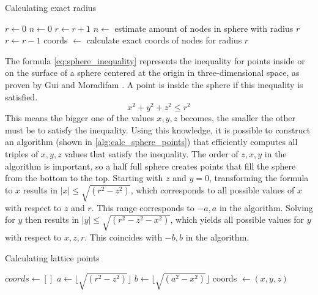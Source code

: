 \begin{algorithm}
\caption{Calculating exact radius}
\label{alg:exact_radius_improved}
\begin{algorithmic}
\State $r \gets 0$
\State $n \gets 0$
    \State $r \gets r + 1$
    \State $n \gets$ estimate amount of nodes in sphere with radius $r$
\EndWhile
\State $ r \gets r - 1$
    \State coords $\gets$ calculate exact coords of nodes for radius $r$
\EndWhile
\end{algorithmic}
\end{algorithm}

The formula \ref{eq:sphere_inequality} represents the inequality for points inside or on the surface of a sphere centered at the origin in three-dimensional space, as proven by Gui and Moradifam \cite{sphereInequality}. A point is inside the sphere if this inequality is satisfied.
\begin{equation}
\label{eq:sphere_inequality}
    x^2 + y^2 + z^2 \leq r^2
\end{equation}
This means the bigger one of the values $x,y,z$ becomes, the smaller the other must be to satisfy the inequality. Using this knowledge, it is possible to construct an algorithm (shown in \ref{alg:calc_sphere_points}) that efficiently computes all triples of $x,y,z$ values that satisfy the inequality. The order of $z,x,y$ in the algorithm is important, so a half full sphere creates points that fill the sphere from the bottom to the top.
Starting with $z$ and $y=0$, transforming the formula to $x$ results in $|x| \leq \sqrt{(r^2 - z^2)}$, which corresponds to all possible values of $x$ with respect to $z$ and $r$. This range corresponds to $-a,a$ in the algorithm. Solving for $y$ then results in $|y| \leq \sqrt{(r^2 - z^2 - x^2)}$, which yields all possible values for $y$ with respect to $x,z,r$. This coincides with $-b,b$ in the algorithm.

\begin{algorithm}
\caption{Calculating lattice points}
\label{alg:calc_sphere_points}
\begin{algorithmic}
\State $coords \gets []$
    \State $a \gets \lfloor\sqrt{(r^2 - z^2)}\rfloor$
        \State $b \gets \lfloor\sqrt{(a^2 - x^2)}\rfloor$
            \State coords $\gets (x,y,z)$
        \EndFor
    \EndFor
\EndFor
\end{algorithmic}
\end{algorithm}

